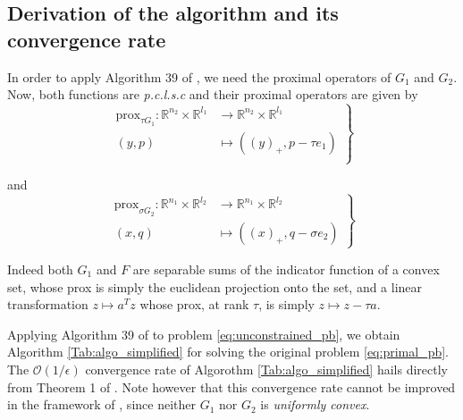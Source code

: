 \documentclass[12pt]{article}
\begin{document}

\subsection{Derivation of the algorithm and its convergence rate}
In order to apply Algorithm 39 of \cite{chambolle2010}, we need the proximal operators of
$G_1$ and $G_2$. Now, both functions are \textit{p.c.l.s.c} and their proximal operators are given by
  \begin{equation}
    \left .
    \begin{split}
      \text{prox}_{\tau G_1} : \mathbb{R}^{n_2} \times \mathbb{R}^{l_1} &\rightarrow \mathbb{R}^{n_2} \times \mathbb{R}^{l_1}\\
      (y, p) &\mapsto ((y)_+, p - \tau e_1)\\
    \end{split}
    \right\}
  \end{equation}

  and
  \begin{equation}
    \left .
    \begin{split}
      \text{prox}_{\sigma G_2}: \mathbb{R}^{n_1} \times \mathbb{R}^{l_2} &\rightarrow \mathbb{R}^{n_1} \times \mathbb{R}^{l_2}\\
      (x, q) &\mapsto ((x)_+, q - \sigma e_2)
    \end{split}
    \right\}
  \end{equation}

Indeed both $G_1$ and $F$ are separable sums of the indicator function of a convex set, whose prox is simply the euclidean projection onto the set,  and a linear transformation $z \mapsto a^Tz$ whose prox, at rank $\tau$, is simply $z \mapsto z - \tau a$.

Applying Algorithm 39 of \cite{chambolle2010} to problem \eqref{eq:unconstrained_pb}, we obtain Algorithm \ref{Tab:algo_simplified} for solving the original problem \eqref{eq:primal_pb}. The $\mathcal{O}(1/\epsilon)$ convergence rate of Algorothm \ref{Tab:algo_simplified} hails directly from Theorem 1 of \cite{chambolle2010}. Note however that this convergence rate cannot be improved in the framework of \cite{chambolle2010}, since neither $G_1$ nor $G_2$ is \textit{uniformly convex}.
\end{document}
